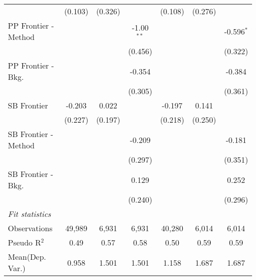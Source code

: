 \begin{tabular}{lcccccc}
                        & (0.103)        & (0.326) &               & (0.108)       & (0.276) &   \\   
   PP Frontier - Method &                &         & -1.00$^{**}$  &               &         & -0.596$^{*}$\\   
                        &                &         & (0.456)       &               &         & (0.322)\\   
   PP Frontier - Bkg.   &                &         & -0.354        &               &         & -0.384\\   
                        &                &         & (0.305)       &               &         & (0.361)\\   
   SB Frontier          & -0.203         & 0.022   &               & -0.197        & 0.141   &   \\   
                        & (0.227)        & (0.197) &               & (0.218)       & (0.250) &   \\   
   SB Frontier - Method &                &         & -0.209        &               &         & -0.181\\   
                        &                &         & (0.297)       &               &         & (0.351)\\   
   SB Frontier - Bkg.   &                &         & 0.129         &               &         & 0.252\\   
                        &                &         & (0.240)       &               &         & (0.296)\\   
   \midrule
   \emph{Fit statistics}\\
   Observations         & 49,989         & 6,931   & 6,931         & 40,280        & 6,014   & 6,014\\  
   Pseudo R$^2$         & 0.49           & 0.57    & 0.58          & 0.50          & 0.59    & 0.59\\  
Mean(Dep. Var.) & 0.958 & 1.501 & 1.501 & 1.158 & 1.687 & 1.687 \\
   

\end{tabular}
